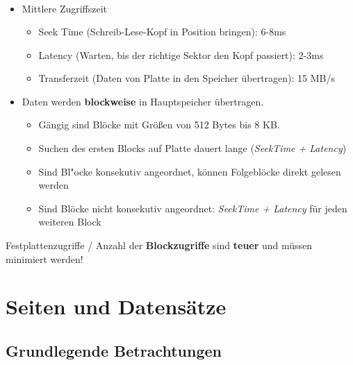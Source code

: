 \begin{frame}
\frametitle{\insertsection}
\framesubtitle{\insertsubsection}
\\[4pt]
\begin{itemize}
	\item Mittlere Zugriffszeit
	\begin{itemize}
		\item Seek Time (Schreib-Lese-Kopf in Position bringen): 6-8ms
		\item Latency (Warten, bis der richtige Sektor den Kopf passiert): 2-3ms
		\item Transferzeit (Daten von Platte in den Speicher übertragen): 15 MB/s
	\end{itemize}
	\pause
	\abs      				
	\item Daten werden \textbf{blockweise} in Hauptspeicher übertragen.
	\begin{itemize}
		\item G\"angig sind Bl\"ocke mit Gr\"o\ss en von 512 Bytes bis 8 KB.
		\item Suchen des ersten Blocks auf Platte dauert lange (\textit{SeekTime + Latency})
		\item Sind Bl"ocke konsekutiv angeordnet, k\"onnen Folgebl\"ocke direkt gelesen werden
		\item Sind Bl\"ocke nicht konsekutiv angeordnet: \textit{SeekTime + Latency} f\"ur jeden weiteren Block 
	\end{itemize}
\end{itemize}
\abs
\pause
\alert{Festplattenzugriffe / Anzahl der \textbf{Blockzugriffe} sind \textbf{teuer} und m\"ussen minimiert werden!}
\end{frame}

\section{Seiten und Datens\"atze}

\subsection{Grundlegende Betrachtungen}

